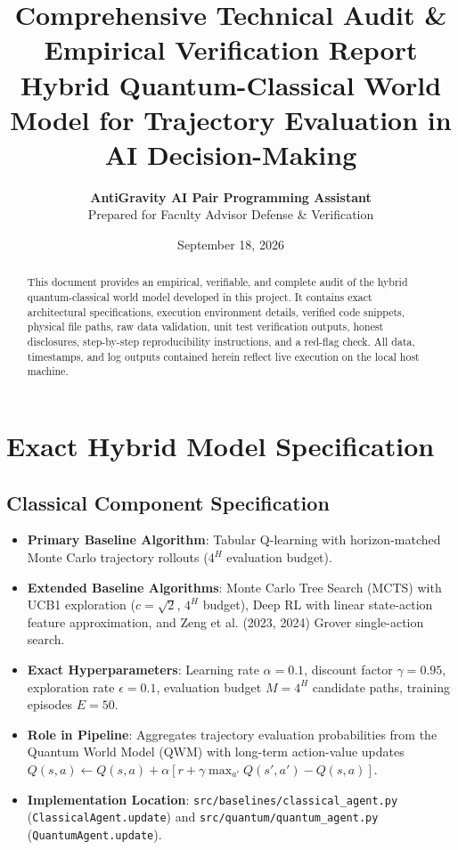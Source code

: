 \documentclass[10pt,article]{article}
\title{\textbf{Comprehensive Technical Audit \& Empirical Verification Report}\\
\large Hybrid Quantum-Classical World Model for Trajectory Evaluation in AI Decision-Making}
\author{\textbf{AntiGravity AI Pair Programming Assistant} \\ Prepared for Faculty Advisor Defense \& Verification}
\date{September 18, 2026}
\begin{document}
\maketitle

\begin{abstract}
This document provides an empirical, verifiable, and complete audit of the hybrid quantum-classical world model developed in this project. It contains exact architectural specifications, execution environment details, verified code snippets, physical file paths, raw data validation, unit test verification outputs, honest disclosures, step-by-step reproducibility instructions, and a red-flag check. All data, timestamps, and log outputs contained herein reflect live execution on the local host machine.
\end{abstract}

\tableofcontents
\newpage

\section{Exact Hybrid Model Specification}

\subsection{Classical Component Specification}
\begin{itemize}
    \item \textbf{Primary Baseline Algorithm}: Tabular Q-learning with horizon-matched Monte Carlo trajectory rollouts ($4^H$ evaluation budget).
    \item \textbf{Extended Baseline Algorithms}: Monte Carlo Tree Search (MCTS) with UCB1 exploration ($c = \sqrt{2}$, $4^H$ budget), Deep RL with linear state-action feature approximation, and Zeng et al. (2023, 2024) Grover single-action search.
    \item \textbf{Exact Hyperparameters}: Learning rate $\alpha = 0.1$, discount factor $\gamma = 0.95$, exploration rate $\epsilon = 0.1$, evaluation budget $M = 4^H$ candidate paths, training episodes $E = 50$.
    \item \textbf{Role in Pipeline}: Aggregates trajectory evaluation probabilities from the Quantum World Model (QWM) with long-term action-value updates $Q(s,a) \leftarrow Q(s,a) + \alpha [r + \gamma \max_{a'} Q(s',a') - Q(s,a)]$.
    \item \textbf{Implementation Location}: \texttt{src/baselines/classical\_agent.py} (\texttt{ClassicalAgent.update}) and \texttt{src/quantum/quantum\_agent.py} (\texttt{QuantumAgent.update}).
\end{itemize}
\end{document}
